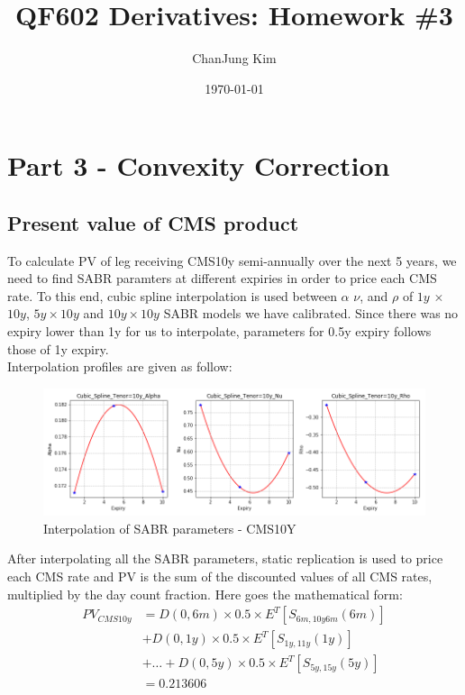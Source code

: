 \documentclass{article}
\title{QF602 Derivatives: Homework \#3} %
\author{ChanJung Kim}
\date{\today} %
\begin{document}
	
	\maketitle %
	
	\section*{Part 3 - Convexity Correction} %
	
	\subsection*{Present value of CMS product}	
	\noindent To calculate PV of leg receiving CMS10y semi-annually over the next 5 years, we need to find SABR paramters at different expiries in order to price each CMS rate. To this end, cubic spline interpolation is used between $\alpha$ $\nu$, and $\rho$ of $1y$ $\times$ $10y$, $5y\times10y$ and $10y\times10y$ SABR models we have calibrated. Since there was no expiry lower than 1y for us to interpolate, parameters for 0.5y expiry follows those of 1y expiry.\\
	
	\noindent Interpolation profiles are given as follow:\\
	
	\begin{figure}[h]
	\centering
	\includegraphics[scale=0.5]{Cubic_10y.png}
	\caption{Interpolation of SABR parameters - CMS10Y}
	\end{figure}	
	
	\noindent After interpolating all the SABR parameters, static replication is used to price each CMS rate and PV is the sum of the discounted values of all CMS rates, multiplied by the day count fraction. Here goes the mathematical form:
	\begin{align*}
	PV_{CMS10y}&=D(0,6m)\times 0.5 \times E^T [S_{6m,10y6m}(6m)] \\&+ D(0,1y) \times 0.5 \times E^T [S_{1y,11y}(1y)]\\&+ \dots 
	+D(0,5y) \times 0.5 \times E^T [S_{5y,15y}(5y)]\\&= 0.213606
	\end{align*}
	
\end{document}
